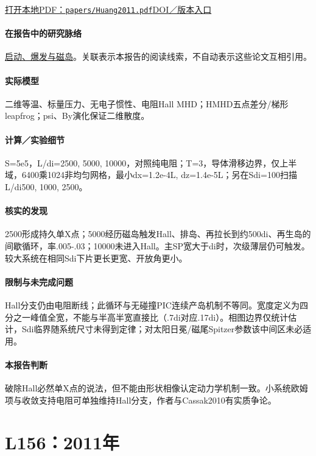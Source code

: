 \href{run:papers/Huang2011.pdf}{打开本地PDF：\texttt{papers/Huang2011.pdf}}\quad\href{https://doi.org/10.1063/1.3606363}{DOI／版本入口}

\paragraph{在报告中的研究脉络}\hyperref[story:onset]{启动、爆发与磁岛}。关联表示本报告的阅读线索，不自动表示这些论文互相引用。

\paragraph{实际模型}二维等温、标量压力、无电子惯性、电阻Hall MHD；HMHD五点差分/梯形leapfrog；psi、By演化保证二维散度。

\paragraph{计算／实验细节}S=5e5，L/di=2500, 5000, 10000，对照纯电阻；T=3，导体滑移边界，仅上半域，6400乘1024非均匀网格，最小dx=1.2e-4L, dz=1.4e-5L；另在Sdi=100扫描L/di500, 1000, 2500。

\paragraph{核实的发现}2500形成持久单X点；5000经历磁岛触发Hall、排岛、再拉长到约500di、再生岛的间歇循环，率.005-.03；10000未进入Hall。主SP宽大于di时，次级薄层仍可触发。较大系统在相同Sdi下片更长更宽、开放角更小。

\paragraph{限制与未完成问题}Hall分支仍由电阻断线；此循环与无碰撞PIC连续产岛机制不等同。宽度定义为四分之一峰值全宽，不能与半高半宽直接比（.7di对应.17di）。相图边界仅统计估计，Sdi临界随系统尺寸未得到定律；对太阳日冕/磁尾Spitzer参数该中间区未必适用。

\paragraph{本报告判断}破除Hall必然单X点的说法，但不能由形状相像认定动力学机制一致。小系统欧姆项与收敛支持电阻可单独维持Hall分支，作者与Cassak2010有实质争论。

\section{L156：2011年}\label{paper:L156}

